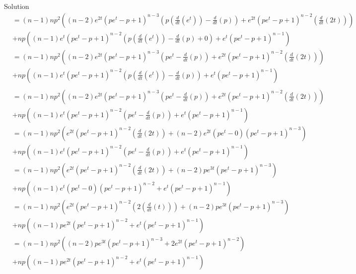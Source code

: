 \documentclass{article}
\begin{document}
\begin{spacing}{1.1}
\begin{homeworkProblem}
\begin{enumerate}[(1)]
\begin{homeworkSection}{Solution}
\begin{align*}
          &=  (n - 1) n p^2 ((n - 2) e^{2 t}  (p e^t - p+1)^{n - 3}  (p (\frac{ d}{ dt} (e^t)) 
            - \frac{ d}{ dt} (p)) + e^{2 t}  (p e^t - p+1)^{n - 2}  (\frac{ d}{ dt} (2 t))) 
            \\&+ n p ((n - 1) e^t (p e^t - p+1)^{n - 2}  (p (\frac{ d}{ dt} (e^t)) - \frac{ d}{ dt} (p) + 0) + e^t (p e^t - p+1)^{n - 1} )\\
          &= (n - 1) n p^2 ((n - 2) e^{2 t}  (p e^t - p+1)^{n - 3}  (p e^t 
            - \frac{ d}{ dt} (p)) + e^{2 t}  (p e^t - p+1)^{n - 2}  (\frac{ d}{ dt} (2 t))) 
            \\&+ n p ((n - 1) e^t (p e^t - p+1)^{n - 2}  (p (\frac{ d}{ dt} (e^t)) - \frac{ d}{ dt} (p)) + e^t (p e^t - p+1)^{n - 1} )\\
          \end{align*}
          \begin{align*}
          &= (n - 1) n p^2 ((n - 2) e^{2 t}  (p e^t - p+1)^{n - 3}  (p e^t 
            - \frac{ d}{ dt} (p)) + e^{2 t}  (p e^t - p+1)^{n - 2}  (\frac{ d}{ dt} (2 t))) 
            \\&+ n p ((n - 1) e^t (p e^t - p+1)^{n - 2}  (p e^t - \frac{ d}{ dt} (p)) + e^t (p e^t - p+1)^{n - 1} )\\
          &= (n - 1) n p^2 (e^{2 t}  (p e^t - p+1)^{n - 2}  (\frac{ d}{ dt} (2 t)) + (n - 2) e^{2 t}  (p e^t - 0) (p e^t - p+1)^{n - 3} ) 
            \\&+ n p ((n - 1) e^t (p e^t - p+1)^{n - 2}  (p e^t - \frac{ d}{ dt} (p)) + e^t (p e^t - p+1)^{n - 1} )\\
          &= (n - 1) n p^2 (e^{2 t}  (p e^t - p+1)^{n - 2}  (\frac{ d}{ dt} (2 t)) + (n - 2) p e^{3 t}  (p e^t - p+1)^{n - 3} ) 
            \\&+ n p ((n - 1) e^t (p e^t - 0) (p e^t - p+1)^{n - 2}  + e^t (p e^t - p+1)^{n - 1} )\\
          &= (n - 1) n p^2 (e^{2 t}  (p e^t - p+1)^{n - 2}  (2 (\frac{ d}{ dt} (t))) + (n - 2) p e^{3 t}  (p e^t - p+1)^{n - 3} ) 
            \\&+ n p ((n - 1) p e^{2 t}  (p e^t - p+1)^{n - 2}  + e^t (p e^t - p+1)^{n - 1} )\\
          &= (n - 1) n p^2 ((n - 2) p e^{3 t}  (p e^t - p+1)^{n - 3}  + 2 e^{2 t}  (p e^t - p+1)^{n - 2} ) 
            \\&+ n p ((n - 1) p e^{2 t}  (p e^t - p+1)^{n - 2}  + e^t (p e^t - p+1)^{n - 1} )\\
\end{align*}
      \end{homeworkSection}

\end{enumerate}
\end{homeworkProblem}
\end{spacing}
\end{document}
